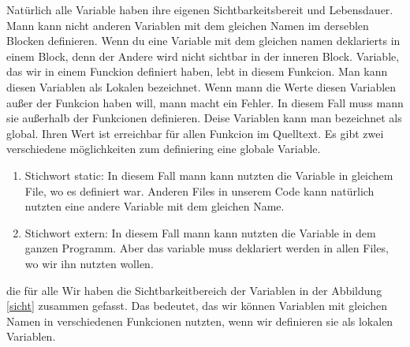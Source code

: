 \documentclass{article}[12pt]
\begin{document}
Natürlich alle Variable haben ihre eigenen Sichtbarkeitsbereit und Lebensdauer. Mann kann nicht anderen Variablen mit dem gleichen Namen 
im derseblen Blocken definieren. Wenn du eine Variable mit dem gleichen namen deklarierts in einem Block, denn der Andere wird nicht
sichtbar in der inneren Block. Variable, das wir in einem Funckion definiert haben, lebt in diesem Funkcion. Man kann diesen Variablen als 
Lokalen bezeichnet. Wenn mann die Werte diesen Variablen außer der Funkcion haben will, mann macht ein Fehler. In diesem Fall 
muss mann sie außerhalb der Funkcionen definieren. Deise Variablen kann man bezeichnet als global. 
Ihren Wert ist erreichbar für allen Funkcion im Quelltext. Es gibt zwei verschiedene möglichkeiten zum definiering
eine globale Variable.
\begin{enumerate}
\item Stichwort static: In diesem Fall mann kann nutzten die Variable in gleichem File, wo es definiert war. Anderen
Files in unserem Code kann natürlich nutzten eine andere Variable mit dem gleichen Name.
\item Stichwort extern: In diesem Fall mann kann nutzten die Variable in dem ganzen Programm. Aber das
variable muss deklariert werden in allen Files, wo wir ihn nutzten wollen.
\end{enumerate} die für alle
Wir haben die Sichtbarkeitbereich der Variablen 
in der Abbildung  \ref{sicht} zusammen gefasst.  Das bedeutet, das wir können Variablen mit 
gleichen Namen in verschiedenen Funkcionen nutzten, wenn wir definieren sie als lokalen Variablen. 
\end{document}
